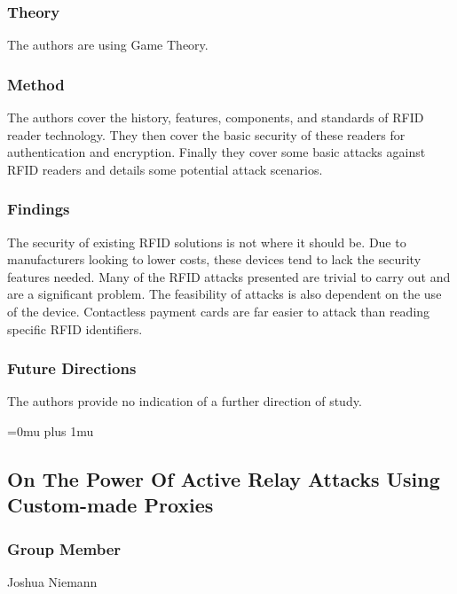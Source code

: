 \subsubsection{Theory}

\noindent
The authors are using Game Theory. 

\subsubsection{Method}

\noindent
The authors cover the history, features, components, and standards of RFID reader technology. They then cover the basic security of these readers for authentication and encryption. Finally they cover some basic attacks against RFID readers and details some potential attack scenarios. 

\subsubsection{Findings}

\noindent
The security of existing RFID solutions is not where it should be. Due to manufacturers looking to lower costs, these devices tend to lack the security features needed. Many of the RFID attacks presented are trivial to carry out and are a significant problem. The feasibility of attacks is also dependent on the use of the device. Contactless payment cards are far easier to attack than reading specific RFID identifiers. 

\subsubsection{Future Directions}

\noindent
The authors provide no indication of a further direction of study. 

\Urlmuskip=0mu plus 1mu\relax

\noindent
\subsection{{O}n {T}he {P}ower {O}f {A}ctive {R}elay {A}ttacks {U}sing {C}ustom-made {P}roxies}

\subsubsection{Group Member}

\noindent
Joshua Niemann

